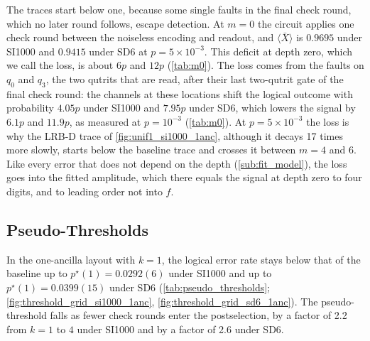 The traces start below one, because some single faults in the final check round, which no later round follows, escape detection. At $m = 0$ the circuit applies one check round between the noiseless encoding and readout, and $\langle \bar{X} \rangle$ is $0.9695$ under SI1000 and $0.9415$ under SD6 at $p = 5\times10^{-3}$. This deficit at depth zero, which we call the loss, is about $6p$ and $12p$ (\autoref{tab:m0}). The loss comes from the faults on $q_0$ and $q_3$, the two qutrits that are read, after their last two-qutrit gate of the final check round: the channels at these locations shift the logical outcome with probability $4.05p$ under SI1000 and $7.95p$ under SD6, which lowers the signal by $6.1p$ and $11.9p$, as measured at $p = 10^{-3}$ (\autoref{tab:m0}). At $p = 5\times10^{-3}$ the loss is why the LRB-D trace of \autoref{fig:unif1_si1000_1anc}, although it decays 17 times more slowly, starts below the baseline trace and crosses it between $m = 4$ and $6$. Like every error that does not depend on the depth (\autoref{sub:fit_model}), the loss goes into the fitted amplitude, which there equals the signal at depth zero to four digits, and to leading order not into $f$.

\subsection{Pseudo-Thresholds}
\label{sub:pseudo_thresholds}

In the one-ancilla layout with $k = 1$, the logical error rate stays below that of the baseline up to $p^\star(1) = 0.0292(6)$ under SI1000 and up to $p^\star(1) = 0.0399(15)$ under SD6 (\autoref{tab:pseudo_thresholds}; \autoref{fig:threshold_grid_si1000_1anc}, \autoref{fig:threshold_grid_sd6_1anc}). The pseudo-threshold falls as fewer check rounds enter the postselection, by a factor of 2.2 from $k = 1$ to $4$ under SI1000 and by a factor of 2.6 under SD6.

